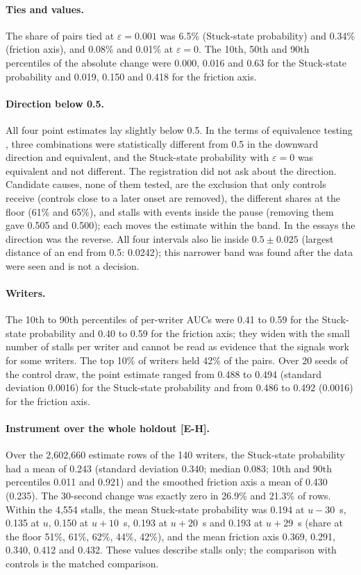 \paragraph{Ties and values.} The share of pairs tied at $\varepsilon = 0.001$ was 6.5\% (Stuck-state probability) and
0.34\% (friction axis), and 0.08\% and 0.01\% at $\varepsilon = 0$. The 10th, 50th and 90th percentiles of the absolute
change were 0.000, 0.016 and 0.63 for the Stuck-state probability and 0.019, 0.150 and 0.418 for the friction axis.

\paragraph{Direction below 0.5.} All four point estimates lay slightly below 0.5. In the terms of equivalence testing
\cite{lakens2018equivalence}, three combinations were statistically different from 0.5 in the downward direction and
equivalent, and the Stuck-state probability with $\varepsilon = 0$ was equivalent and not different. The registration
did not ask about the direction. Candidate causes, none of them tested, are the exclusion that only controls receive
(controls close to a later onset are removed), the different shares at the floor (61\% and 65\%), and stalls with events
inside the pause (removing them gave 0.505 and 0.500); each moves the estimate within the band. In the essays the
direction was the reverse. All four intervals also lie inside $0.5 \pm 0.025$ (largest distance of an end from 0.5:
0.0242); this narrower band was found after the data were seen and is not a decision.

\paragraph{Writers.} The 10th to 90th percentiles of per-writer AUCs were 0.41 to 0.59 for the Stuck-state probability and
0.40 to 0.59 for the friction axis; they widen with the small number of stalls per writer and cannot be read as evidence
that the signals work for some writers. The top 10\% of writers held 42\% of the pairs. Over 20 seeds of the control
draw, the point estimate ranged from 0.488 to 0.494 (standard deviation 0.0016) for the Stuck-state probability and from
0.486 to 0.492 (0.0016) for the friction axis.

\paragraph{Instrument over the whole holdout [E-H].} Over the 2,602,660 estimate rows of the 140 writers, the
Stuck-state probability had a mean of 0.243 (standard deviation 0.340; median 0.083; 10th and 90th percentiles 0.011 and
0.921) and the smoothed friction axis a mean of 0.430 (0.235). The 30-second change was exactly zero in 26.9\% and
21.3\% of rows. Within the 4,554 stalls, the mean Stuck-state probability was 0.194 at $u - 30$~s, 0.135 at $u$, 0.150
at $u + 10$~s, 0.193 at $u + 20$~s and 0.193 at $u + 29$~s (share at the floor 51\%, 61\%, 62\%, 44\%, 42\%), and the
mean friction axis 0.369, 0.291, 0.340, 0.412 and 0.432. These values describe stalls only; the comparison with controls
is the matched comparison.

